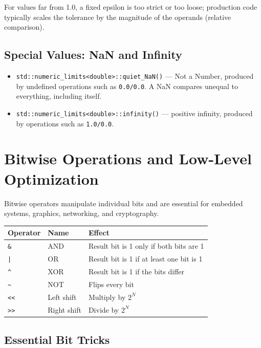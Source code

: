 For values far from 1.0, a fixed epsilon is too strict or too loose; production code typically scales the tolerance by the magnitude of the operands (relative comparison).

\subsection{Special Values: NaN and Infinity}

\begin{itemize}
    \item \texttt{std::numeric\_limits<double>::quiet\_NaN()} --- Not a Number, produced by undefined operations such as \texttt{0.0/0.0}. A NaN compares unequal to everything, including itself.
    \item \texttt{std::numeric\_limits<double>::infinity()} --- positive infinity, produced by operations such as \texttt{1.0/0.0}.
\end{itemize}

\section{Bitwise Operations and Low-Level Optimization}
\label{sec:bitwise}

Bitwise operators manipulate individual bits and are essential for embedded systems, graphics, networking, and cryptography.

\begin{center}
\begin{tabular}{|l|l|l|}
\hline
\textbf{Operator} & \textbf{Name} & \textbf{Effect} \\
\hline
\texttt{\&} & AND & Result bit is 1 only if both bits are 1 \\
\texttt{|} & OR & Result bit is 1 if at least one bit is 1 \\
\texttt{\^{}} & XOR & Result bit is 1 if the bits differ \\
\texttt{\~{}} & NOT & Flips every bit \\
\texttt{<<} & Left shift & Multiply by $2^N$ \\
\texttt{>>} & Right shift & Divide by $2^N$ \\
\hline
\end{tabular}
\end{center}

\subsection{Essential Bit Tricks}

